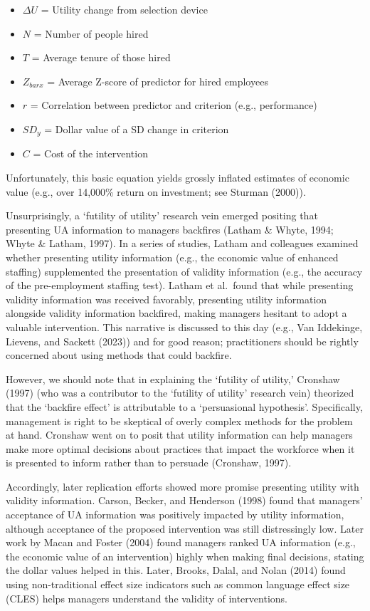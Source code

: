 \documentclass[
  english,
  man]{apa6}
\providecommand{\tightlist}{%
  \setlength{\itemsep}{0pt}\setlength{\parskip}{0pt}}
\begin{document}
\begin{itemize}
\tightlist
\item
  \(\Delta U\) = Utility change from selection device
\item
  \(N\) = Number of people hired
\item
  \(T\) = Average tenure of those hired
\item
  \(Z_{barx}\) = Average Z-score of predictor for hired employees
\item
  \(r\) = Correlation between predictor and criterion (e.g., performance)
\item
  \(SD_y\) = Dollar value of a SD change in criterion
\item
  \(C\) = Cost of the intervention
\end{itemize}

Unfortunately, this basic equation yields grossly inflated estimates of economic value (e.g., over 14,000\% return on investment; see Sturman (2000)).

Unsurprisingly, a `futility of utility' research vein emerged positing that presenting UA information to managers backfires (Latham \& Whyte, 1994; Whyte \& Latham, 1997). In a series of studies, Latham and colleagues examined whether presenting utility information (e.g., the economic value of enhanced staffing) supplemented the presentation of validity information (e.g., the accuracy of the pre-employment staffing test). Latham et al.~found that while presenting validity information was received favorably, presenting utility information alongside validity information backfired, making managers hesitant to adopt a valuable intervention. This narrative is discussed to this day (e.g., Van Iddekinge, Lievens, and Sackett (2023)) and for good reason; practitioners should be rightly concerned about using methods that could backfire.

However, we should note that in explaining the `futility of utility,' Cronshaw (1997) (who was a contributor to the `futility of utility' research vein) theorized that the `backfire effect' is attributable to a `persuasional hypothesis'. Specifically, management is right to be skeptical of overly complex methods for the problem at hand. Cronshaw went on to posit that utility information can help managers make more optimal decisions about practices that impact the workforce when it is presented to inform rather than to persuade (Cronshaw, 1997).

Accordingly, later replication efforts showed more promise presenting utility with validity information. Carson, Becker, and Henderson (1998) found that managers' acceptance of UA information was positively impacted by utility information, although acceptance of the proposed intervention was still distressingly low. Later work by Macan and Foster (2004) found managers ranked UA information (e.g., the economic value of an intervention) highly when making final decisions, stating the dollar values helped in this. Later, Brooks, Dalal, and Nolan (2014) found using non-traditional effect size indicators such as common language effect size (CLES) helps managers understand the validity of interventions.
\end{document}
